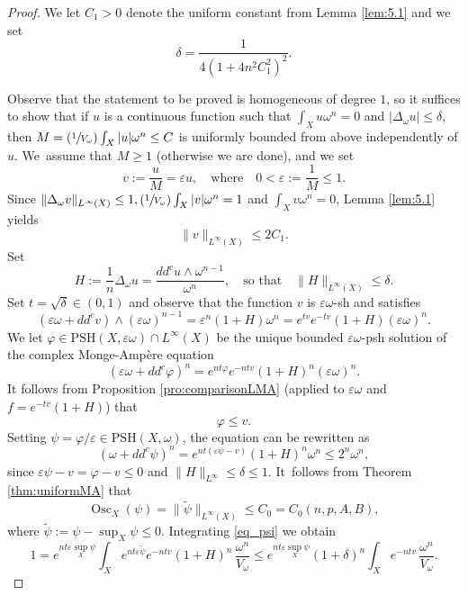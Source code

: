 \documentclass[10pt]{amsart}
\newcommand{\Psfrac}[2]{(\sfrac{#1}{#2})}
\DeclareMathOperator{\Osc}{Osc}
\theoremstyle{definition}
\let\e\varepsilon
\newcommand \PSH {\mathrm{PSH}}
\begin{document}
\begin{proof}
We let $C_1>0$ denote the uniform constant from Lemma \ref{lem:5.1} and we set
\[
\delta=\frac{1}{4(1+4n^2C_1^2)^{2}}.
\]

Observe that the statement to be proved is homogeneous of degree $1$, so it suffices to show that
if $u$ is a continuous function such that $\int_X u \omega^n=0$ and $|\Delta_{\omega} u| \leq \delta$,
then $M=\Psfrac{1}{V_\omega}\int_ X |u|\omega^n \leq C$ is uniformly bounded from above independently of $u$. We~assume that $M \geq 1$ (otherwise we are done), and we set
\[
v:=\frac{u}{M} =\varepsilon u,
\quad \text{where} \quad
0<\varepsilon:= \frac{1}{M}\leq 1.
\]
Since $\|\Delta_\omega v\|_{L^\infty(X)} \leq 1, \Psfrac{1}{V_\omega} \int_X |v|\omega^n=1$
and $\int_X v\omega^n=0$, Lemma \ref{lem:5.1} yields
\begin{equation}\label{eq_bound_v}
\|v\|_{L^\infty(X)} \leq 2C_1.
\end{equation}
Set
\[
H:=\frac{1}{n}\Delta_\omega u= \frac{dd^c u\wedge \omega^{n-1}}{\omega^n},
\quad \text{so that} \quad
\|H\|_{L^\infty(X)}\leq \delta.
\]
Set $t=\sqrt{\delta} \in (0,1)$ and observe that the function $v$ is $\varepsilon\omega$-sh
and satisfies
\[
(\varepsilon\omega+dd^c v)\wedge (\varepsilon\omega)^{n-1}=\varepsilon^n(1+H)\omega^n= e^{tv }e^{-tv}(1+H) (\varepsilon \omega)^n .
\]
We let $\varphi\in\PSH(X, \varepsilon \omega)\cap L^{\infty}(X)$ be the unique bounded
$\e\omega$-psh solution of the complex Monge-Ampère equation
\[
(\varepsilon \omega +dd^c \varphi )^n= e^{nt\varphi }e^{-ntv}(1+H)^n (\varepsilon \omega)^n.
\]
It follows from Proposition \ref{pro:comparisonLMA}
(applied to $\e \omega$ and $f=e^{-tv}(1+H)$) that
\begin{equation}\label{eq_phi_v}
\varphi\leq v.
\end{equation}
Setting $ \psi=\varphi/ \varepsilon \in\PSH(X, \omega)$, the equation can be rewritten as
\begin{equation}\label{eq_psi}
( \omega +dd^c \psi )^n= e^{nt(\varepsilon\psi-v )}(1+H)^n \omega^n \leq 2^n \omega^n,
\end{equation}
since $\varepsilon\psi-v=\varphi-v \leq 0$ and $\|H\|_{L^\infty}\leq \delta \leq 1$. It~follows from Theorem \ref{thm:uniformMA} that
\[
\Osc_X (\psi)= \|\tilde{\psi}\|_{L^\infty(X)}\leq C_0=C_0(n,p,A,B),
\]
where $\tilde{\psi}:=\psi-\sup_X \psi \leq 0$.
Integrating \eqref{eq_psi} we obtain
\[
1= e^{nt\varepsilon \sup_X \psi} \int_X e^{nt\varepsilon\tilde{\psi}}e^{-ntv}(1+H)^n\,\frac{\omega^n}{V_\omega}
\leq e^{nt\varepsilon \sup_X \psi}(1+\delta)^n\int_X e^{-ntv}\,\frac{\omega^n}{V_\omega}.
\]
\end{proof}
\end{document}
